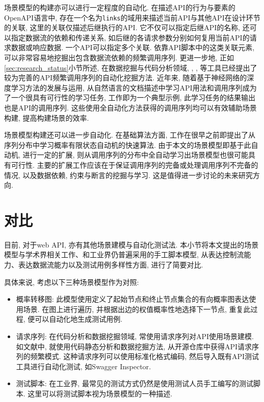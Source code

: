         场景模型的构建亦可以进行一定程度的自动化. 在描述API的行为与要素的OpenAPI语言中, 存在一个名为\texttt{links}的域用来描述当前API与其他API在设计环节的关联, 这里的关联仅描述后继执行的API. 它不仅可以指定后继API的名称, 还可以指定数据流的依赖和传递关系, 如后继的各请求参数分别如何复用当前API的请求数据或响应数据. 一个API可以指定多个关联. 依靠API脚本中的这类关联元素, 可以非常容易地挖掘出包含数据流依赖的频繁调用序列. 更进一步地, 正如\ref{sec:research_status}小节所述, 在数据挖掘与代码分析领域, , , 等工具已经提出了较为完善的API频繁调用序列的自动化挖掘方法. 近年来, 随着基于神经网络的深度学习方法的发展与运用, 从自然语言的文档描述中学习API用法和调用序列成为了一个很具有可行性的学习任务, 工作即为一个典型示例, 此学习任务的结果输出也是API的调用序列. 这些使用全自动化方法获得的调用序列均可以有效辅助场景构建, 提高构建场景的效率.
        
        场景模型构建还可以进一步自动化. 在基础算法方面, 工作在很早之前即提出了从序列分布中学习概率有限状态自动机的快速算法. 由于本文的场景模型即基于此自动机, 进行一定的扩展, 则从调用序列的分布中全自动学习出场景模型也很可能具有可行性. 主要的扩展工作应该在于保证调用序列的完备或处理调用序列不完备的情况, 以及数据依赖, 约束与断言的挖掘与学习. 这是值得进一步讨论的未来研究方向.
        
    \section{对比}
        目前, 对于web API, 亦有其他场景建模与自动化测试法. 本小节将本文提出的场景模型与学术界相关工作、和工业界仍普遍采用的手工脚本模型, 从表达控制流能力、表达数据流能力以及测试用例多样性方面, 进行了简要对比.
    
        具体来说, 考虑以下三种场景模型作为对照:
        \begin{itemize}
            \item 概率转移图\cite{junyiw17}: 此模型使用定义了起始节点和终止节点集合的有向概率图表达使用场景. 在图上进行遍历, 并根据出边的权值概率性地选择下一节点, 重复此过程, 便可以自动化地生成测试用例.
            
            \item 请求序列: 在代码分析和数据挖掘领域, 常使用请求序列对API使用场景建模. 如文献中, 就使用代码静态分析和数据挖掘方法, 从开源仓库中获得API请求序列的频繁模式. 这种请求序列可以使用标准化格式编码, 然后导入既有API测试工具进行自动化测试, 如Swagger Inspector\cite{swaggerinspetor17}.
            
            \item 测试脚本: 在工业界, 最常见的测试方式仍然是使用测试人员手工编写的测试脚本. 这里可以将测试脚本视为场景模型的一种描述.
        \end{itemize}
        
